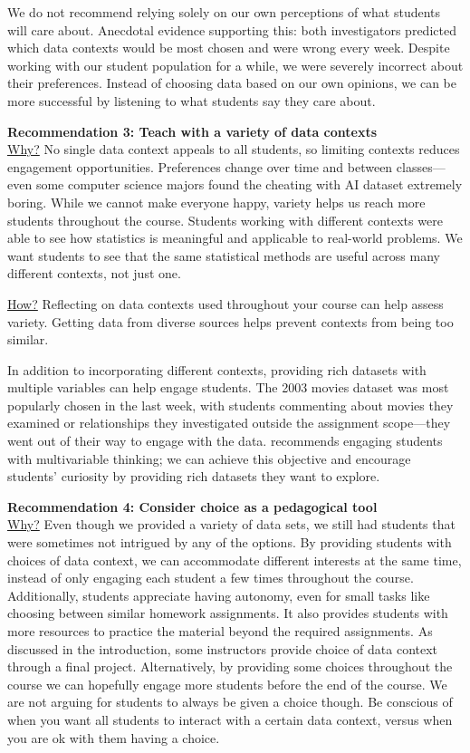 \documentclass[
  12pt]{article}
\begin{document}
We do not recommend relying solely on our own perceptions of what
students will care about. Anecdotal evidence supporting this: both
investigators predicted which data contexts would be most chosen and
were wrong every week. Despite working with our student population for a
while, we were severely incorrect about their preferences. Instead of
choosing data based on our own opinions, we can be more successful by
listening to what students say they care about.

\textbf{Recommendation 3: Teach with a variety of data contexts}\\
\underline{Why?} No single data context appeals to all students, so
limiting contexts reduces engagement opportunities. Preferences change
over time and between classes---even some computer science majors found
the cheating with AI dataset extremely boring. While we cannot make
everyone happy, variety helps us reach more students throughout the
course. Students working with different contexts were able to see how
statistics is meaningful and applicable to real-world problems. We want
students to see that the same statistical methods are useful across many
different contexts, not just one.

\underline{How?} Reflecting on data contexts used throughout your course
can help assess variety. Getting data from diverse sources helps prevent
contexts from being too similar.

In addition to incorporating different contexts, providing rich datasets
with multiple variables can help engage students. The 2003 movies
dataset was most popularly chosen in the last week, with students
commenting about movies they examined or relationships they investigated
outside the assignment scope---they went out of their way to engage with
the data. \citet{gaise2016} recommends engaging students with
multivariable thinking; we can achieve this objective and encourage
students' curiosity by providing rich datasets they want to explore.

\textbf{Recommendation 4: Consider choice as a pedagogical tool}\\
\underline{Why?} Even though we provided a variety of data sets, we
still had students that were sometimes not intrigued by any of the
options. By providing students with choices of data context, we can
accommodate different interests at the same time, instead of only
engaging each student a few times throughout the course. Additionally,
students appreciate having autonomy, even for small tasks like choosing
between similar homework assignments. It also provides students with
more resources to practice the material beyond the required assignments.
As discussed in the introduction, some instructors provide choice of
data context through a final project. Alternatively, by providing some
choices throughout the course we can hopefully engage more students
before the end of the course. We are not arguing for students to always
be given a choice though. Be conscious of when you want all students to
interact with a certain data context, versus when you are ok with them
having a choice.
\end{document}
